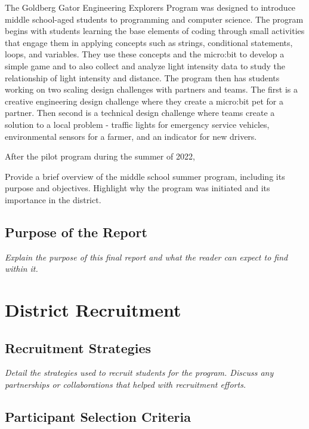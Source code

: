 \documentclass[
]{article}
\begin{document}
The Goldberg Gator Engineering Explorers Program was designed to
introduce middle school-aged students to programming and computer
science. The program begins with students learning the base elements of
coding through small activities that engage them in applying concepts
such as strings, conditional statements, loops, and variables. They use
these concepts and the micro:bit to develop a simple game and to also
collect and analyze light intensity data to study the relationship of
light intensity and distance. The program then has students working on
two scaling design challenges with partners and teams. The first is a
creative engineering design challenge where they create a micro:bit pet
for a partner. Then second is a technical design challenge where teams
create a solution to a local problem - traffic lights for emergency
service vehicles, environmental sensors for a farmer, and an indicator
for new drivers.

After the pilot program during the summer of 2022,

Provide a brief overview of the middle school summer program, including
its purpose and objectives. Highlight why the program was initiated and
its importance in the district.

\hypertarget{purpose-of-the-report}{%
\subsection{Purpose of the Report}\label{purpose-of-the-report}}

\emph{Explain the purpose of this final report and what the reader can
expect to find within it.}

\hypertarget{district-recruitment}{%
\section{District Recruitment}\label{district-recruitment}}

\hypertarget{recruitment-strategies}{%
\subsection{Recruitment Strategies}\label{recruitment-strategies}}

\emph{Detail the strategies used to recruit students for the program.
Discuss any partnerships or collaborations that helped with recruitment
efforts.}

\hypertarget{participant-selection-criteria}{%
\subsection{Participant Selection
Criteria}\label{participant-selection-criteria}}
\end{document}
